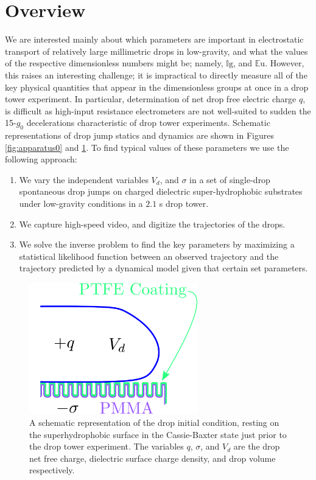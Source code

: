 \documentclass[12pt,a4paper,oneside]{book}
\begin{document}
\section{Overview}
We are interested mainly about which parameters are important in electrostatic transport of relatively large millimetric drops in low-gravity, and what the values of the respective dimensionless numbers might be; namely, $\mathbb{I}\mbox{g}$, and $\mathbb{E}\mbox{u}$. However, this raises an interesting challenge; it is impractical to directly measure all of the key physical quantities that appear in the dimensionless groups at once in a drop tower experiment. In particular, determination of net drop free electric charge $q$, is difficult as high-input resistance electrometers are not well-suited to sudden the 15-$g_0$ decelerations characteristic of drop tower experiments. Schematic representations of drop jump statics and dynamics are shown in Figures \ref{fig:apparatus0} and \ref{fig:schematic}. To find typical values of these parameters we use the following approach:
\begin{enumerate}
\item We vary the independent variables $V_d$, and $\sigma$ in a set of single-drop spontaneous drop jumps on charged dielectric super-hydrophobic substrates under low-gravity conditions in a $2.1$ s drop tower. 
\item We capture high-speed video, and digitize the trajectories of the drops. 
\item We solve the inverse problem to find the key parameters by maximizing a statistical likelihood function between an observed trajectory and the trajectory predicted by a dynamical model given that certain set parameters.
\end{enumerate}
\begin{figure}[ht]
 \centering
 \includegraphics[width=0.65\textwidth]{../figures/schematic.pdf}
 \caption{A schematic representation of the drop initial condition, resting on the superhydrophobic surface in the Cassie-Baxter state just prior to the drop tower experiment. The variables $q$, $\sigma$, and $V_d$ are the drop net free charge, dielectric surface charge density, and drop volume respectively.\label{fig:schematic}}
\end{figure}
\end{document}
